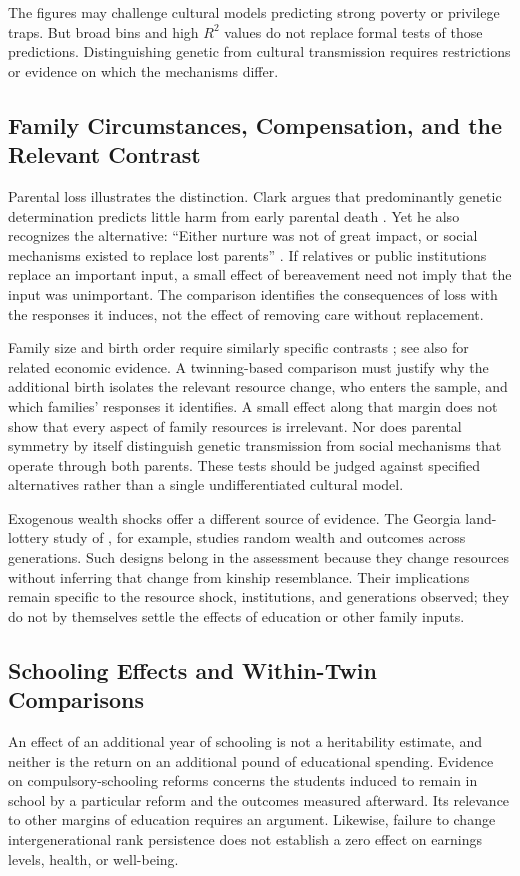 The figures may challenge cultural models predicting strong poverty or
privilege traps. But broad bins and high $R^2$ values do not replace
formal tests of those predictions. Distinguishing genetic from cultural
transmission requires restrictions or evidence on which the mechanisms
differ.


\subsection{Family Circumstances, Compensation, and the Relevant Contrast}
Parental loss illustrates the distinction. Clark argues that predominantly
genetic determination predicts little harm from early parental death
\citep[p.~189]{Clark2026}. Yet he also recognizes the alternative:
``Either nurture was not of great impact, or social mechanisms existed to
replace lost parents'' \citep[p.~288]{Clark2026}. If relatives or public
institutions replace an important input, a small effect of bereavement
need not imply that the input was unimportant. The comparison identifies
the consequences of loss with the responses it induces, not the effect
of removing care without replacement.

Family size and birth order require similarly specific contrasts \citep[ch.~8]{Clark2026}; see also \citet{BlackDevereuxSalvanes2005} for related economic evidence. A
twinning-based comparison must justify why the additional birth isolates
the relevant resource change, who enters the sample, and which families'
responses it identifies. A small effect along that margin does not show
that every aspect of family resources is irrelevant. Nor does parental
symmetry by itself distinguish genetic transmission from social mechanisms
that operate through both parents. These tests should be judged against
specified alternatives rather than a single undifferentiated cultural model.

Exogenous wealth shocks offer a different source of evidence. The Georgia
land-lottery study of \citet{BleakleyFerrie2016}, for example, studies random
wealth and outcomes across generations. Such designs belong in the
assessment because they change resources without inferring that change
from kinship resemblance. Their implications remain specific to the
resource shock, institutions, and generations observed; they do not by
themselves settle the effects of education or other family inputs.

\subsection{Schooling Effects and Within-Twin Comparisons}
An effect of an additional year of schooling is not a heritability estimate,
and neither is the return on an additional pound of educational spending.
Evidence on compulsory-schooling reforms concerns the students induced to
remain in school by a particular reform and the outcomes measured afterward.
Its relevance to other margins of education requires an argument. Likewise,
failure to change intergenerational rank persistence does not establish a
zero effect on earnings levels, health, or well-being.


